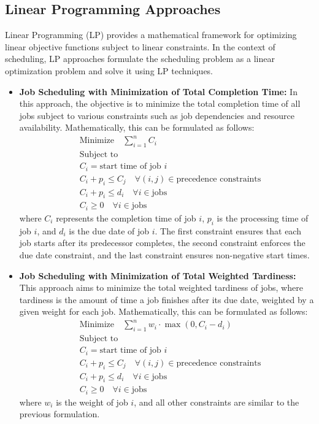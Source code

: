 \documentclass[12pt]{book} %
\begin{document}
\subsection{Linear Programming Approaches}

Linear Programming (LP) provides a mathematical framework for optimizing linear objective functions subject to linear constraints. In the context of scheduling, LP approaches formulate the scheduling problem as a linear optimization problem and solve it using LP techniques.

\begin{itemize}
    \item \textbf{Job Scheduling with Minimization of Total Completion Time:} In this approach, the objective is to minimize the total completion time of all jobs subject to various constraints such as job dependencies and resource availability. Mathematically, this can be formulated as follows:
    \FloatBarrier
    \begin{align*}
        & \text{Minimize} \quad \sum_{i=1}^{n} C_i \\
        & \text{Subject to} \\
        & C_i = \text{start time of job } i \\
        & C_i + p_i \leq C_j \quad \forall (i, j) \in \text{precedence constraints} \\
        & C_i + p_i \leq d_i \quad \forall i \in \text{jobs} \\
        & C_i \geq 0 \quad \forall i \in \text{jobs}
    \end{align*}
    \FloatBarrier
    where \(C_i\) represents the completion time of job \(i\), \(p_i\) is the processing time of job \(i\), and \(d_i\) is the due date of job \(i\). The first constraint ensures that each job starts after its predecessor completes, the second constraint enforces the due date constraint, and the last constraint ensures non-negative start times.
    
    \item \textbf{Job Scheduling with Minimization of Total Weighted Tardiness:} This approach aims to minimize the total weighted tardiness of jobs, where tardiness is the amount of time a job finishes after its due date, weighted by a given weight for each job. Mathematically, this can be formulated as follows:
    \FloatBarrier
    \begin{align*}
        & \text{Minimize} \quad \sum_{i=1}^{n} w_i \cdot \max(0, C_i - d_i) \\
        & \text{Subject to} \\
        & C_i = \text{start time of job } i \\
        & C_i + p_i \leq C_j \quad \forall (i, j) \in \text{precedence constraints} \\
        & C_i + p_i \leq d_i \quad \forall i \in \text{jobs} \\
        & C_i \geq 0 \quad \forall i \in \text{jobs}
    \end{align*}
    \FloatBarrier
    where \(w_i\) is the weight of job \(i\), and all other constraints are similar to the previous formulation.
\end{itemize}
\end{document}
